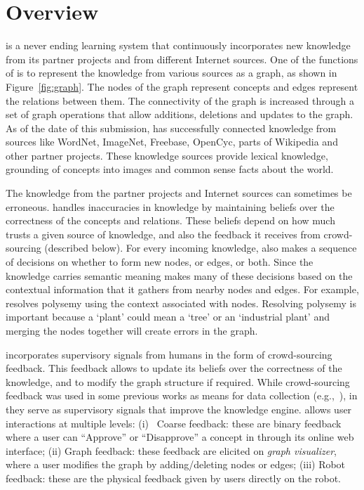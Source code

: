 
\section{Overview}
\label{overviewPaper}

\robobrain{} is a never ending learning system  that  continuously incorporates
new knowledge from  its partner projects and from different Internet sources.
One of the functions of \robobrain{} is to represent the knowledge from various sources as a graph,
as shown in  Figure~\ref{fig:graph}. The nodes of the graph represent concepts and edges represent the
relations between them. The connectivity of the graph is increased through a set of graph operations
that allow additions, deletions and updates to the graph. As of the date of this submission,
\robobrain{} has successfully
connected knowledge from sources like WordNet, ImageNet, Freebase, OpenCyc,
 parts of Wikipedia and other partner projects. These knowledge sources provide lexical knowledge, grounding of concepts into images and common sense facts about the world.

The knowledge from the partner projects and Internet sources can sometimes be erroneous. \robobrain{}
handles inaccuracies in  knowledge by maintaining beliefs over the correctness of the concepts and
relations. These beliefs depend on how much \robobrain{} trusts a given source of knowledge, and also the
feedback it receives from crowd-sourcing (described below). For every incoming knowledge, \robobrain{}
also makes a sequence of decisions on whether to form new nodes, or edges, or both. Since the
knowledge carries semantic meaning \robobrain{} makes many of these decisions based on the
contextual information that it gathers from nearby nodes and edges. For example, \robobrain{} resolves
polysemy using the context associated with nodes. Resolving polysemy is important because a `plant'
could mean a `tree' or an `industrial plant' and merging the nodes together will create errors in the
graph.


\robobrain{} incorporates supervisory signals from humans in the form of crowd-sourcing feedback. This
feedback allows \robobrain{} to update its beliefs over the correctness of the knowledge, and to modify the
graph structure if required. While crowd-sourcing feedback was used in some previous works as
means for data collection (e.g.,~\citep{imagenet2009,Russell08}), in \robobrain{} they serve as supervisory
signals that improve the knowledge engine. \robobrain{} allows user interactions at multiple levels: (i)~
Coarse feedback: these are binary feedback where a user can ``Approve'' or ``Disapprove'' a concept
in \robobrain{} through its online web interface; (ii) Graph feedback: these feedback are elicited on 
\robobrain{} \textit{graph visualizer}, where a user modifies the graph by adding/deleting nodes or edges; (iii)
Robot feedback: these are the physical feedback given by users directly on the robot.

